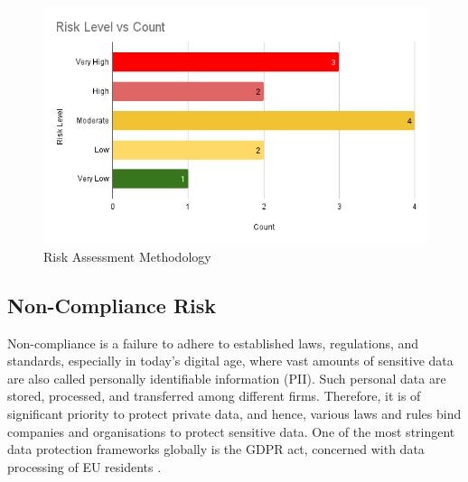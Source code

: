 \begin{figure}[h!]
\centering
\includegraphics[width=\textwidth]{pics/risk_level_vs_count.png}
\caption{Risk Assessment Methodology}\label{fig:Risk Level Counts}
\end{figure}

\subsection{Non-Compliance Risk}
Non-compliance is a failure to adhere to established laws, regulations, and standards, especially in today's digital age, where vast amounts of sensitive data are also called personally identifiable information (PII). Such personal data are stored, processed, and transferred among different firms. Therefore, it is of significant priority to protect private data, and hence, various laws and rules bind companies and organisations to protect sensitive data. One of the most stringent data protection frameworks globally is the GDPR act, concerned with data processing of EU residents \citep{gdpr_stringent}. 